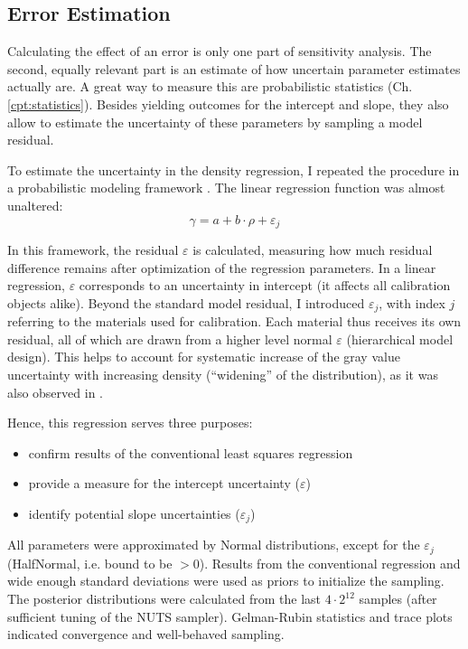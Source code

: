 \subsection{Error Estimation}
\label{sec:orgb23db3f}
Calculating the effect of an error is only one part of sensitivity analysis.
The second, equally relevant part is an estimate of how uncertain parameter estimates actually are.
A great way to measure this are probabilistic statistics (Ch. \ref{cpt:statistics}).
Besides yielding outcomes for the intercept and slope, they also allow to estimate the uncertainty of these parameters by sampling a model residual.


To estimate the uncertainty in the density regression, I repeated the procedure in a probabilistic modeling framework \citep[PyMC, Version 5.6,][]{Salvatier2016}.
The linear regression function was almost unaltered:
\[\gamma = a+b\cdot\rho + \varepsilon_{j}\]


In this framework, the residual \(\varepsilon\) is calculated, measuring how much residual difference remains after optimization of the regression parameters.
In a linear regression, \(\varepsilon\) corresponds to an uncertainty in intercept (it affects all calibration objects alike).
Beyond the standard model residual, I introduced \(\varepsilon_{j}\), with index \(j\) referring to the materials used for calibration.
Each material thus receives its own residual, all of which are drawn from a higher level normal \(\varepsilon\) (hierarchical model design).
This helps to account for systematic increase of the gray value uncertainty with increasing density (``widening'' of the distribution), as it was also observed in \citet{DuPlessis2013}.

Hence, this regression serves three purposes:
\begin{itemize}
\item confirm results of the conventional least squares regression
\item provide a measure for the intercept uncertainty (\(\varepsilon\))
\item identify potential slope uncertainties (\(\varepsilon_{j}\))
\end{itemize}


All parameters were approximated by Normal distributions, except for the \(\varepsilon_{j}\) (HalfNormal, i.e. bound to be \(>0\)).
Results from the conventional regression and wide enough standard deviations were used as priors to initialize the sampling.
The posterior distributions were calculated from the last \(4\cdot 2^{12}\) samples (after sufficient tuning of the NUTS sampler).
Gelman-Rubin statistics and trace plots indicated convergence and well-behaved sampling.


